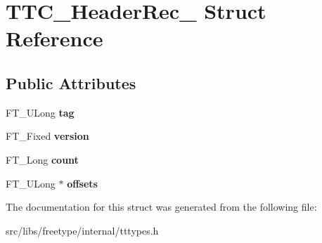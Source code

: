 \hypertarget{struct_t_t_c___header_rec__}{
\section{TTC\_\-HeaderRec\_\- Struct Reference}
\label{struct_t_t_c___header_rec__}
}
\subsection*{Public Attributes}
\begin{DoxyCompactItemize}
\item 
\hypertarget{struct_t_t_c___header_rec___a7fc09906e402f8937b6ca207c84453b4}{
FT\_\-ULong {\bfseries tag}}
\label{struct_t_t_c___header_rec___a7fc09906e402f8937b6ca207c84453b4}

\item 
\hypertarget{struct_t_t_c___header_rec___aa9ecb33279c68c3c00c1232441da5801}{
FT\_\-Fixed {\bfseries version}}
\label{struct_t_t_c___header_rec___aa9ecb33279c68c3c00c1232441da5801}

\item 
\hypertarget{struct_t_t_c___header_rec___a0bf5898e9d8c55bc74f51712a5ad1b58}{
FT\_\-Long {\bfseries count}}
\label{struct_t_t_c___header_rec___a0bf5898e9d8c55bc74f51712a5ad1b58}

\item 
\hypertarget{struct_t_t_c___header_rec___a2ab33f787e8085d7086968fb931060b5}{
FT\_\-ULong $\ast$ {\bfseries offsets}}
\label{struct_t_t_c___header_rec___a2ab33f787e8085d7086968fb931060b5}

\end{DoxyCompactItemize}


The documentation for this struct was generated from the following file:\begin{DoxyCompactItemize}
\item 
src/libs/freetype/internal/tttypes.h\end{DoxyCompactItemize}
